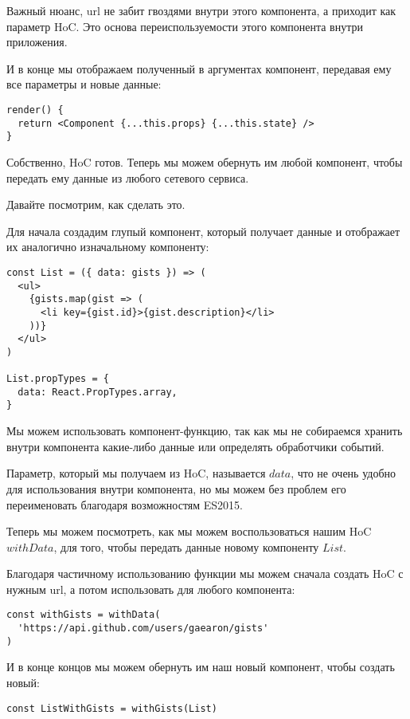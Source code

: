 Важный нюанс, url не забит гвоздями внутри этого компонента, а приходит как параметр HoC. Это основа переиспользуемости этого компонента внутри приложения.

И в конце мы отображаем полученный в аргументах компонент, передавая ему все параметры и новые данные:

\begin{lstlisting}
render() {
  return <Component {...this.props} {...this.state} />
}
\end{lstlisting} 

Собственно, HoC готов. Теперь мы можем обернуть им любой компонент, чтобы передать ему данные из любого сетевого сервиса.

Давайте посмотрим, как сделать это.

Для начала создадим глупый компонент, который получает данные  и отображает их аналогично изначальному компоненту:

\begin{lstlisting}
const List = ({ data: gists }) => (
  <ul>
    {gists.map(gist => (
      <li key={gist.id}>{gist.description}</li>
    ))} 
  </ul>
)

List.propTypes = {
  data: React.PropTypes.array,
}
\end{lstlisting}

Мы можем использовать компонент-функцию, так как мы не собираемся хранить внутри компонента какие-либо данные или определять обработчики событий.

Параметр, который мы получаем из HoC, называется $data$, что не очень удобно для использования внутри компонента, но мы можем без проблем его переименовать благодаря возможностям ES2015.

Теперь мы можем посмотреть, как мы можем воспользоваться нашим HoC $withData$, для того, чтобы передать данные новому компоненту $List$.

Благодаря частичному использованию функции мы можем сначала создать HoC с нужным url, а потом использовать для любого компонента:

\begin{lstlisting}
const withGists = withData(
  'https://api.github.com/users/gaearon/gists'
)
\end{lstlisting}

И в конце концов мы можем обернуть им наш новый компонент, чтобы создать новый:

\begin{lstlisting}
const ListWithGists = withGists(List)
\end{lstlisting}

